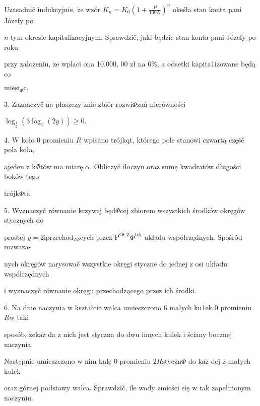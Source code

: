 \documentclass[a4paper,12pt]{article}
\begin{document}
Uzasadnič indukcyjnie, $\dot{\mathrm{z}}\mathrm{e}$ wzór $K_{n}=K_{0}(1+\displaystyle \frac{P}{100N})^{n}$ okeśla stan konta pani Józefy po

$n$-tym okresie kapitalizacyjnym. Sprawdzič, jaki będzie stan konta pani Józefy po roku

przy załozeniu, $\dot{\mathrm{z}}\mathrm{e}$ wplaci ona 10.000, 00 zł na 6\%, a odsetki kapita1izowane będą co

$\mathrm{m}\mathrm{i}\mathrm{e}\mathrm{s}\mathrm{i}_{\Phi}\mathrm{c}.$

3. Zaznaczyč na płaszczy $\acute{\mathrm{z}}\mathrm{n}\mathrm{i}\mathrm{e}$ zbiór rozwi$\Phi$zań nierówności

$\log_{\frac{1}{2}}(3\log_{x}(2y))\geq 0.$

4. $\mathrm{W}$ koło $0$ promieniu $R$ wpisano trójkqt, którego pole stanowi czwartą częśč pola koła,

ajeden $\mathrm{z}$ k$\Phi$tów ma miarę $\alpha$. Obliczyč iloczyn oraz sumę kwadratów długości boków tego

trójk$\Phi$ta.

5. Wyznaczyč równanie krzywej będ$\Phi$cej zbiorem wszystkich środków okręgów stycznych do

prostej $y=2\mathrm{i}\mathrm{p}\mathrm{r}\mathrm{z}\mathrm{e}\mathrm{c}\mathrm{h}\mathrm{o}\mathrm{d}_{\mathrm{Z}\Phi}$cych przez $\mathrm{P}^{\mathrm{O}\mathrm{C}\mathrm{Z}}\Phi^{\mathrm{t}\mathrm{e}\mathrm{k}}$ układu współrzędnych. Spośród rozwaza-

nych okręgów narysowač wszystkie okręgi styczne do jednej $\mathrm{z}$ osi układu współrzędnych

$\mathrm{i}$ wyznaczyč równanie okręgu przechodzącego przez ich środki.

6. Na dnie naczynia $\mathrm{w}$ kształcie walca umieszczono 6 małych ku1ek $0$ promieniu $R\mathrm{w}$ taki

sposób, $\dot{\mathrm{z}}\mathrm{e}\mathrm{k}\mathrm{a}\dot{\mathrm{z}}$ da $\mathrm{z}$ nich jest styczna do dwu innych kulek $\mathrm{i}$ ściany bocznej naczynia.

Następnie umieszczono $\mathrm{w}$ nim kulę $0$ promieniu $ 2R\mathrm{s}\mathrm{t}\mathrm{y}\mathrm{c}\mathrm{z}\mathrm{n}\Phi$ do $\mathrm{k}\mathrm{a}\dot{\mathrm{z}}$ dej $\mathrm{z}$ małych kulek

oraz górnej podstawy walca. Sprawdzič, ile wody zmieści się $\mathrm{w}$ tak zapełnionym naczyniu.
\end{document}

